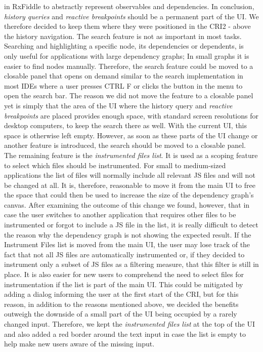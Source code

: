 in RxFiddle to abstractly represent observables and dependencies. In conclusion, \emph{history queries} and \emph{reactive breakpoints} should be a permanent part of the UI. We therefore decided to keep them where they were positioned in the CRI2 - above the history navigation.
The search feature is not as important in most tasks. Searching and highlighting a specific node, its dependencies or dependents, is only useful for applications with large dependency graphs; In small graphs it is easier to find nodes manually. Therefore, the search feature could be moved to a closable panel that opens on demand similar to the search implementation in most IDEs where a user presses CTRL F or clicks the button in the menu to open the search bar. The reason we did not move the feature to a closable panel yet is simply that the area of the UI where the history query and \emph{reactive breakpoints} are placed provides enough space, with standard screen resolutions for desktop computers, to keep the search there as well. With the current UI, this space is otherwise left empty. However, as soon as these parts of the UI change or another feature is introduced, the search should be moved to a closable panel. The remaining feature is the \emph{instrumented files list}. It is used as a scoping feature to select which files should be instrumented. For small to medium-sized applications the list of files will normally include all relevant JS files and will not be changed at all. It is, therefore, reasonable to move it from the main UI to free the space that could then be used to increase the size of the dependency graph's canvas. After examining the outcome of this change we found, however, that in case the user switches to another application that requires other files to be instrumented or forgot to include a JS file in the list, it is really difficult to detect the reason why the dependency graph is not showing the expected result. If the Instrument Files list is moved from the main UI, the user may lose track of the fact that not all JS files are automatically instrumented or, if they decided to instrument only a subset of JS files as a filtering measure, that this filter is still in place. It is also easier for new users to comprehend the need to select files for instrumentation if the list is part of the main UI. This could be mitigated by adding a dialog informing the user at the first start of the CRI, but for this reason, in addition to the reasons mentioned above, we decided the benefits outweigh the downside of a small part of the UI being occupied by a rarely changed input. Therefore, we kept the \emph{instrumented files list} at the top of the UI and also added a red border around the text input in case the list is empty to help make new users aware of the missing input.

